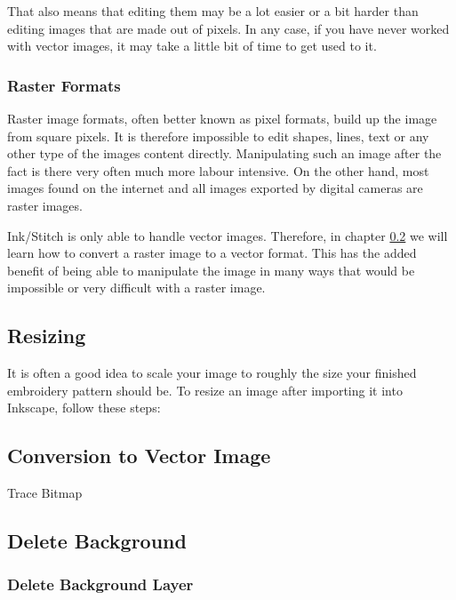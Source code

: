 \documentclass{article}
\begin{document}
                That also means that editing them may be a lot easier or a bit harder than editing images that are made out of pixels.
                In any case, if you have never worked with vector images, it may take a little bit of time to get used to it.

            \subsubsection{Raster Formats}

                Raster image formats, often better known as pixel formats, build up the image from square pixels. It is therefore impossible to edit shapes, lines, text or any other type of the images content directly.
                Manipulating such an image after the fact is there very often much more labour intensive. On the other hand, most images found on the internet and all images exported by digital cameras are raster images.

                Ink/Stitch is only able to handle vector images. Therefore, in chapter \ref{vectorConversion}  we will learn how to  convert a raster image to a vector format.
                This has the added benefit of being able to manipulate the image in many ways that would be impossible or very difficult with a raster image.
        
        \subsection{Resizing}

        It is often a good idea to scale your image to roughly the size your finished embroidery pattern should be. To resize an image after importing it into Inkscape, follow these steps:  
        
        \subsection{Conversion to Vector Image} \label{vectorConversion}
        Trace Bitmap    

        \subsection{Delete Background}
        \subsubsection{Delete Background Layer}
\end{document}
